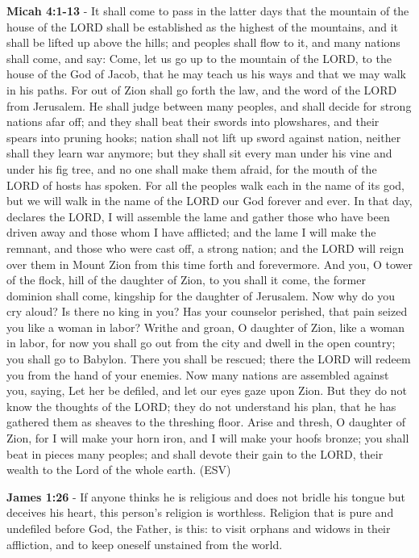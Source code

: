 \documentclass[11pt]{article}
\begin{document}
\textbf{Micah 4:1-13} -  It shall come to pass in the latter days that the mountain of the house of the LORD shall be established as the highest of the mountains, and it shall be lifted up above the hills; and peoples shall flow to it, and many nations shall come, and say: Come, let us go up to the mountain of the LORD, to the house of the God of Jacob, that he may teach us his ways and that we may walk in his paths.  For out of Zion shall go forth the law, and the word of the LORD from Jerusalem.  He shall judge between many peoples, and shall decide for strong nations afar off; and they shall beat their swords into plowshares, and their spears into pruning hooks; nation shall not lift up sword against nation, neither shall they learn war anymore; but they shall sit every man under his vine and under his fig tree, and no one shall make them afraid, for the mouth of the LORD of hosts has spoken.  For all the peoples walk each in the name of its god, but we will walk in the name of the LORD our God forever and ever.  In that day, declares the LORD, I will assemble the lame and gather those who have been driven away and those whom I have afflicted; and the lame I will make the remnant, and those who were cast off, a strong nation; and the LORD will reign over them in Mount Zion from this time forth and forevermore.  And you, O tower of the flock, hill of the daughter of Zion, to you shall it come, the former dominion shall come, kingship for the daughter of Jerusalem.  Now why do you cry aloud?  Is there no king in you?  Has your counselor perished, that pain seized you like a woman in labor?  Writhe and groan, O daughter of Zion, like a woman in labor, for now you shall go out from the city and dwell in the open country; you shall go to Babylon.  There you shall be rescued; there the LORD will redeem you from the hand of your enemies.  Now many nations are assembled against you, saying, Let her be defiled, and let our eyes gaze upon Zion.  But they do not know the thoughts of the LORD; they do not understand his plan, that he has gathered them as sheaves to the threshing floor.  Arise and thresh, O daughter of Zion, for I will make your horn iron, and I will make your hoofs bronze; you shall beat in pieces many peoples; and shall devote their gain to the LORD, their wealth to the Lord of the whole earth.  (ESV)

\textbf{James 1:26} - If anyone thinks he is religious and does not bridle his tongue but deceives his heart, this person's religion is worthless. Religion that is pure and undefiled before God, the Father, is this: to visit orphans and widows in their affliction, and to keep oneself unstained from the world.
\end{document}
